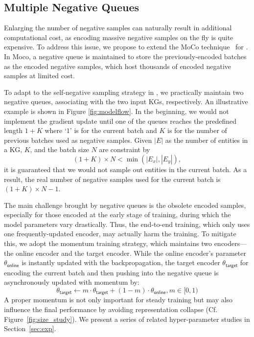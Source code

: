 
\subsection{Multiple Negative Queues}
\label{sec:mnq}

Enlarging the number of negative samples can naturally result in additional computational cost, as  encoding massive negative samples on the fly is quite expensive. 
To address this issue, we propose to extend the MoCo technique~\cite{he2020momentum} for \solution. 
In Moco, a negative queue is maintained to store the previously-encoded batches as the encoded negative samples, which host thousands of encoded negative samples at limited cost. 

To adapt to the self-negative sampling strategy in \solution, we practically maintain two negative queues, associating with the two input KGs, respectively. 
An illustrative example is shown in Figure \ref{fig:modelflow}. 
In the beginning, we would not implement the gradient update until one of the queues reaches the predefined length $1+K$ where `$1$' is for the current batch and $K$ is for the number of previous batches used as negative samples. 
Given $|E|$ as the number of entities in a KG, $K$, and the batch size $N$ are constraint by
\begin{equation}
    (1+K)\times N< \min(|E_x|,|E_y|), 
\end{equation}
it is guaranteed that we would not sample out entities in the current batch. 
As a result, the real number of negative samples used for the current batch is $(1 + K)\times N - 1$.



The main challenge brought by negative queues is the obsolete encoded samples, especially for those encoded at the early stage of training, during which the model parameters vary drastically. 
Thus, the end-to-end training, which only uses one frequently-updated encoder, may actually harm the training. 
To mitigate this, we adopt the momentum training strategy, which maintains two encoders---the online encoder and the target encoder. 
While the online encoder's parameter $\theta_\mathsf{online}$ is instantly updated with the backpropagation, the target encoder $\theta_\mathsf{target}$ for encoding the current batch and then pushing into the negative queue is asynchronously updated with momentum by:
\begin{equation}
\label{eq:momentum}
    \theta_\mathsf{target} \gets m\cdot\theta_\mathsf{target} + (1-m)\cdot\theta_\mathsf{online}, m\in [0,1)
\end{equation}
A proper momentum is not only important for steady training but may also influence the final performance by avoiding representation collapse (Cf. Figure~\ref{fig:size_study}). We present a series of related hyper-parameter studies in Section~\ref{sec:exp}.




